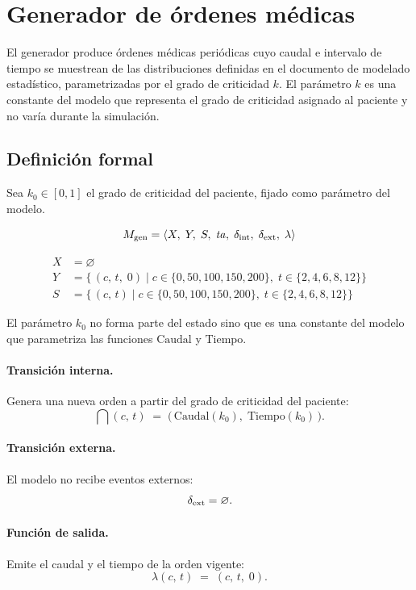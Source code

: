\section{Generador de órdenes médicas}

El generador produce órdenes médicas periódicas cuyo caudal e intervalo
de tiempo se muestrean de las distribuciones definidas en el documento
de modelado estadístico, parametrizadas por el grado de criticidad $k$.
El parámetro $k$ es una constante del modelo que representa el grado
de criticidad asignado al paciente y no varía durante la simulación.

\subsection{Definición formal}

Sea $k_0 \in [0,1]$ el grado de criticidad del paciente, fijado como
parámetro del modelo.

\[
  M_{\mathrm{gen}} = \langle X,\; Y,\; S,\; \mathit{ta},\; \delta_{\mathrm{int}},\; \delta_{\mathrm{ext}},\; \lambda \rangle
\]

\begin{align*}
  X &= \varnothing \\[4pt]
  Y &= \bigl\{\,(c,\,t,\;0)\;\big|\;
        c\in\{0,50,100,150,200\},\;
        t\in\{2,4,6,8,12\}\bigr\} \\[4pt]
  S &= \bigl\{\,(c,\,t)\;\big|\;
        c\in\{0,50,100,150,200\},\;
        t\in\{2,4,6,8,12\}\bigr\}
\end{align*}

El parámetro $k_0$ no forma parte del estado sino que es una constante
del modelo que parametriza las funciones $\mathrm{Caudal}$ y $\mathrm{Tiempo}$.

\paragraph{Transición interna.}
Genera una nueva orden a partir del grado de criticidad del paciente:
\[
  \dint(c,\,t)
  \;=\;
  \bigl(\,\mathrm{Caudal}(k_0),\;\mathrm{Tiempo}(k_0)\,\bigr).
\]

\paragraph{Transición externa.}
El modelo no recibe eventos externos:
\[
  \delta_{\mathrm{ext}} = \varnothing.
\]

\paragraph{Función de salida.}
Emite el caudal y el tiempo de la orden vigente:
\[
  \lambda(c,\,t) \;=\; (c,\,t,\;0).
\]

